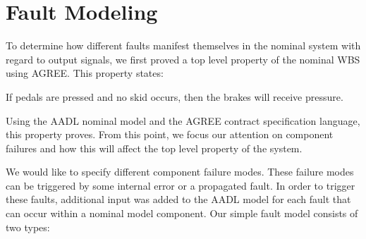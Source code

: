 \section{Fault Modeling}

To determine how different faults manifest themselves in the nominal system with regard to output signals, we first proved a top level property of the nominal WBS using AGREE. This property states: \\

\begin{tt}
If pedals are pressed and no skid occurs, then the brakes will receive pressure. \\
\end{tt}

Using the AADL nominal model and the AGREE contract specification language, this property proves. From this point, we focus our attention on component failures and how this will affect the top level property of the system. 

We would like to specify different component failure modes. These failure modes can be triggered by some internal error or a propagated fault. In order to trigger these faults, additional input was added to the AADL model for each fault that can occur within a nominal model component. Our simple fault model consists of two types:

